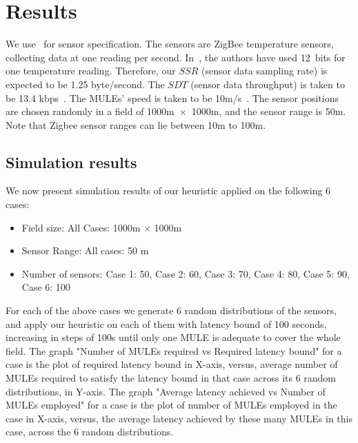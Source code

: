 \chapter{Results}\label{chapter:5}


We use~\cite{terada} for sensor specification. The sensors are ZigBee temperature sensors, collecting data at one reading per second. In~\cite{terada}, the authors have used 12~bits for one temperature reading. Therefore, our $SSR$ (sensor data sampling rate) is expected to be 1.25 byte/second. The $SDT$ (sensor data throughput) is taken to be 13.4 kbps~\cite{zigbee}. The MULEs' speed is taken to be 10m/s~\cite{muleSpeed}. The sensor positions are chosen randomly in a field of 1000m~$\times$~1000m, and the sensor range is 50m. Note that Zigbee sensor ranges can lie between 10m to 100m.

\section{Simulation results}
We now present simulation results of our heuristic applied on the following 6 cases:
\begin{itemize}
\item Field size: All Cases: 1000m $\times$ 1000m
\item Sensor Range: All cases: 50 m
\item Number of sensors: Case 1: 50, Case 2: 60, Case 3: 70, Case 4: 80, Case 5: 90, Case 6: 100
\end{itemize}

For each of the above cases we generate 6 random distributions of the sensors, and apply our heuristic on each of them with latency bound of 100 seconds, increasing in steps of 100s until only one MULE is adequate to cover the whole field. The graph "Number of MULEs required vs Required latency bound" for a case is the plot of required latency bound in X-axis, versus, average number of MULEs required to satisfy the latency bound in that case across its 6 random distributions, in Y-axis. The graph "Average latency achieved vs Number of MULEs employed" for a case is the plot of number of MULEs employed in the case in X-axis, versus, the average latency achieved by these many MULEs in this case, across the 6 random distributions.

